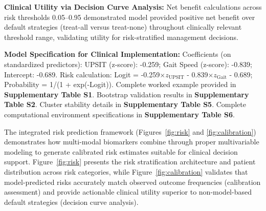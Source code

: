 \documentclass[11pt]{article}
\begin{document}
\textbf{Clinical Utility via Decision Curve Analysis:} Net benefit calculations across risk thresholds 0.05--0.95 demonstrated model provided positive net benefit over default strategies (treat-all versus treat-none) throughout clinically relevant threshold range, validating utility for risk-stratified management decisions.

\textbf{Model Specification for Clinical Implementation:} Coefficients (on standardized predictors): UPSIT (z-score): -0.259; Gait Speed (z-score): -0.839; Intercept: -0.689. Risk calculation: Logit = -0.259$\times z_{\text{UPSIT}}$ - 0.839$\times z_{\text{Gait}}$ - 0.689; Probability = 1/(1 + exp(-Logit)). Complete worked example provided in \textbf{Supplementary Table S1}. Bootstrap validation results in \textbf{Supplementary Table S2}. Cluster stability details in \textbf{Supplementary Table S5}. Complete computational environment specifications in \textbf{Supplementary Table S6}.

The integrated risk prediction framework (Figures~\ref{fig:risk} and \ref{fig:calibration}) demonstrates how multi-modal biomarkers combine through proper multivariable modeling to generate calibrated risk estimates suitable for clinical decision support. Figure~\ref{fig:risk} presents the risk stratification architecture and patient distribution across risk categories, while Figure~\ref{fig:calibration} validates that model-predicted risks accurately match observed outcome frequencies (calibration assessment) and provide actionable clinical utility superior to non-model-based default strategies (decision curve analysis).
\end{document}
